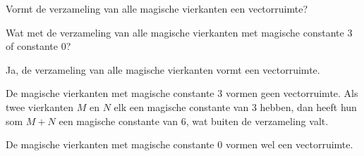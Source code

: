 \documentclass{ximera}
\begin{document}
\begin{exercise}
    \begin{question}
        Vormt de verzameling van alle magische vierkanten een vectorruimte?
    \end{question}
    \begin{question}
        Wat met de verzameling van alle magische vierkanten met magische constante \(3\) of constante \(0\)?
    \end{question}
    \begin{oplossing}
        Ja, de verzameling van alle magische vierkanten vormt een vectorruimte.

        De magische vierkanten met magische constante \(3\) vormen geen vectorruimte.
        Als twee vierkanten \(M\) en \(N\) elk een magische constante van \(3\) hebben, dan heeft hun som \(M + N\) een magische constante van \(6\), wat buiten de verzameling valt.

        De magische vierkanten met magische constante \(0\) vormen wel een vectorruimte.
    \end{oplossing}
\end{exercise}
\end{document}
